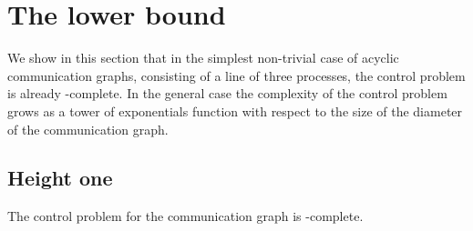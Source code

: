 \documentclass{llncs}
\begin{document}
\section{The lower bound}

We show in this section that in the simplest non-trivial case of
acyclic communication graphs, consisting of a line of three processes,
the control problem is already \EXPTIME-complete. In the general case
the complexity of the control problem grows as a tower of exponentials
function with respect to the size of the diameter of the communication
graph. 


\subsection{Height one}
\begin{proposition} \label{p:3} 
  The control problem for the communication graph  is
  \EXPTIME-complete.
\end{proposition}

\medskip
\end{document}
